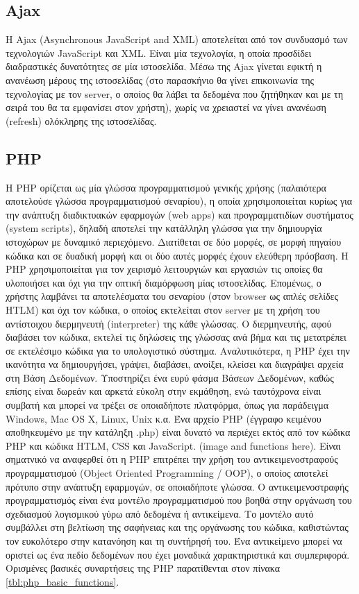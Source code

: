 \subsection{Ajax}
Η Ajax (Asynchronous JavaScript and XML) αποτελείται από τον συνδυασμό των τεχνολογιών JavaScript και XML. Είναι μία τεχνολογία, η οποία προσδίδει διαδραστικές δυνατότητες σε μία ιστοσελίδα. Μέσω της Ajax γίνεται εφικτή η ανανέωση μέρους της ιστοσελίδας (στο παρασκήνιο θα γίνει επικοινωνία της τεχνολογίας με τον server, ο οποίος θα λάβει τα δεδομένα που ζητήθηκαν και με τη σειρά του θα τα εμφανίσει στον χρήστη), χωρίς να χρειαστεί να γίνει ανανέωση (refresh) ολόκληρης της ιστοσελίδας.

\subsection{PHP}
Η PHP ορίζεται ως μία γλώσσα προγραμματισμού γενικής χρήσης (παλαιότερα αποτελούσε γλώσσα προγραμματισμού σεναρίου), η οποία χρησιμοποιείται κυρίως για την ανάπτυξη διαδικτυακών εφαρμογών (web apps) και προγραμματιδίων συστήματος (system scripts), δηλαδή αποτελεί την κατάλληλη γλώσσα για την δημιουργία ιστοχώρων με δυναμικό περιεχόμενο. Διατίθεται σε δύο μορφές, σε μορφή πηγαίου κώδικα και σε δυαδική μορφή και οι δύο αυτές μορφές έχουν ελεύθερη πρόσβαση. Η PHP χρησιμοποιείται για τον χειρισμό λειτουργιών και εργασιών τις οποίες θα υλοποιήσει και όχι για την οπτική διαμόρφωση μίας ιστοσελίδας. Επομένως, ο χρήστης λαμβάνει τα αποτελέσματα του σεναρίου (στον browser ως απλές σελίδες HTLM) και όχι τον κώδικα, ο οποίος εκτελείται στον server με τη χρήση του αντίστοιχου διερμηνευτή (interpreter) της κάθε γλώσσας. Ο διερμηνευτής, αφού διαβάσει τον κώδικα, εκτελεί τις δηλώσεις της γλώσσας ανά βήμα και τις μετατρέπει σε εκτελέσιμο κώδικα για το υπολογιστικό σύστημα. Αναλυτικότερα, η PHP έχει την ικανότητα να δημιουργήσει, γράψει, διαβάσει, ανοίξει, κλείσει και διαγράψει αρχεία στη Βάση Δεδομένων. Υποστηρίζει ένα ευρύ φάσμα Βάσεων Δεδομένων, καθώς επίσης είναι δωρεάν και αρκετά εύκολη στην εκμάθηση, ενώ ταυτόχρονα είναι συμβατή και μπορεί να τρέξει σε οποιαδήποτε πλατφόρμα, όπως για παράδειγμα Windows, Mac OS X, Linux, Unix κ.α. Ένα αρχείο PHP (έγγραφο κειμένου αποθηκευμένο με την κατάληξη .php) είναι δυνατό να περιέχει εκτός από τον κώδικα PHP και κώδικα HTLM, CSS και JavaScript. (image and functions here). Είναι σηματνικό να αναφερθεί ότι η PHP επιτρέπει την χρήση του αντικειμενοστραφούς προγραμματισμού (Object Oriented Programming / OOP), ο οποίος αποτελεί πρότυπο στην ανάπτυξη εφαρμογών, σε οποιαδήποτε γλώσσα. Ο αντικειμενοστραφής προγραμματισμός είναι ένα μοντέλο προγραμματισμού που βοηθά στην οργάνωση του σχεδιασμού λογισμικού γύρω από δεδομένα ή αντικείμενα. Το μοντέλο αυτό συμβάλλει στη βελτίωση της σαφήνειας και της οργάνωσης του κώδικα, καθιστώντας τον ευκολότερο στην κατανόηση και τη συντήρησή του. Ένα αντικείμενο μπορεί να οριστεί ως ένα πεδίο δεδομένων που έχει μοναδικά χαρακτηριστικά και συμπεριφορά. Ορισμένες βασικές συναρτήσεις της PHP παρατίθενται στον πίνακα \ref{tbl:php_basic_functions}.

